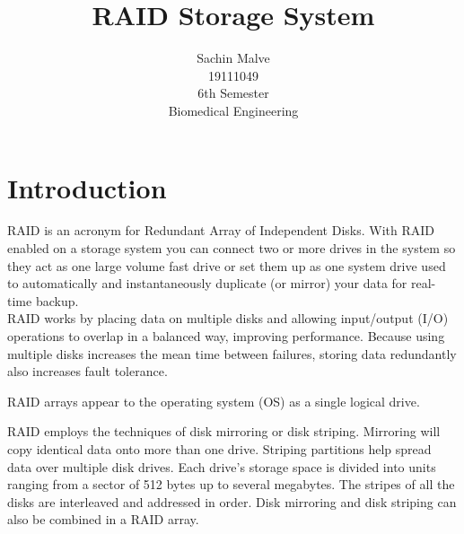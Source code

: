 \documentclass{article}
\begin{document}
\title{RAID Storage System}


\author{Sachin Malve \\
	19111049 \\
 	6th Semester \\ 
	Biomedical Engineering\\
	}

\maketitle 
 \hrulefill

\section{Introduction}
 RAID is an acronym for Redundant Array of Independent Disks. With RAID enabled on a storage system you can connect two or more drives in the system so they act as one large volume fast drive or set them up as one system drive used to automatically and instantaneously duplicate (or mirror) your data for real-time backup. \\
 RAID works by placing data on multiple disks and allowing input/output (I/O) operations to overlap in a balanced way, improving performance. Because using multiple disks increases the mean time between failures, storing data redundantly also increases fault tolerance.

RAID arrays appear to the operating system (OS) as a single logical drive.

RAID employs the techniques of disk mirroring or disk striping. Mirroring will copy identical data onto more than one drive. Striping partitions help spread data over multiple disk drives. Each drive's storage space is divided into units ranging from a sector of 512 bytes up to several megabytes. The stripes of all the disks are interleaved and addressed in order. Disk mirroring and disk striping can also be combined in a RAID array.
\end{document}
